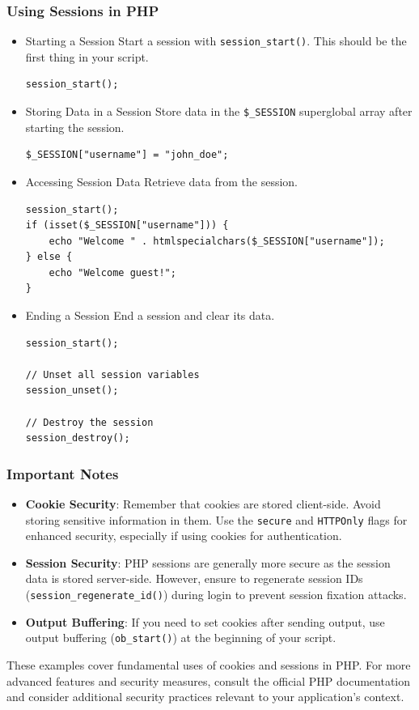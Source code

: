 \documentclass[11pt]{article}
\begin{document}
\subsubsection{Using Sessions in PHP}
\label{sec:org957c1cd}
\begin{itemize}
\item Starting a Session
\label{sec:org9362221}
Start a session with \texttt{session\_start()}. This should be the first thing
in your script.

\begin{verbatim}
session_start();
\end{verbatim}

\item Storing Data in a Session
\label{sec:orgf8e16eb}
Store data in the \texttt{\$\_SESSION} superglobal array after starting the
session.

\begin{verbatim}
$_SESSION["username"] = "john_doe";
\end{verbatim}

\item Accessing Session Data
\label{sec:org1b62024}
Retrieve data from the session.

\begin{verbatim}
session_start();
if (isset($_SESSION["username"])) {
    echo "Welcome " . htmlspecialchars($_SESSION["username"]);
} else {
    echo "Welcome guest!";
}
\end{verbatim}

\item Ending a Session
\label{sec:org9793bb9}
End a session and clear its data.

\begin{verbatim}
session_start();

// Unset all session variables
session_unset();

// Destroy the session
session_destroy();
\end{verbatim}
\end{itemize}

\subsubsection{Important Notes}
\label{sec:org415a6c0}
\begin{itemize}
\item \textbf{Cookie Security}: Remember that cookies are stored client-side. Avoid
storing sensitive information in them. Use the \texttt{secure} and \texttt{HTTPOnly}
flags for enhanced security, especially if using cookies for
authentication.

\item \textbf{Session Security}: PHP sessions are generally more secure as the
session data is stored server-side. However, ensure to regenerate
session IDs (\texttt{session\_regenerate\_id()}) during login to prevent
session fixation attacks.

\item \textbf{Output Buffering}: If you need to set cookies after sending output,
use output buffering (\texttt{ob\_start()}) at the beginning of your script.
\end{itemize}

These examples cover fundamental uses of cookies and sessions in PHP.
For more advanced features and security measures, consult the official
PHP documentation and consider additional security practices relevant to
your application's context.
\end{document}
